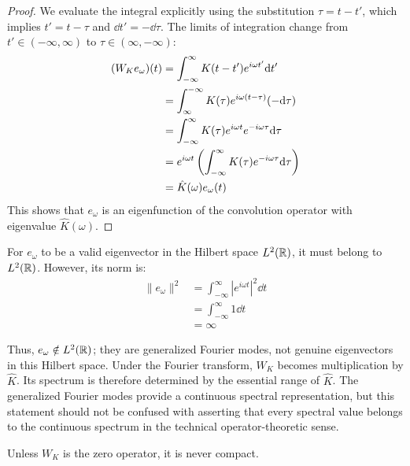 \begin{proof}
We evaluate the integral explicitly using the substitution $\tau = t - t'$, which implies $t' = t - \tau$ and $\dd t' = -\dd \tau$. The limits of integration change from $t' \in (-\infty, \infty)$ to $\tau \in (\infty, -\infty)$:
\begin{align}
(W_K e_\omega)(t) &= \int_{-\infty}^\infty K(t-t') e^{i\omega t'} \mathrm{d} t' \notag \\
    &= \int_{\infty}^{-\infty} K(\tau) e^{i\omega (t-\tau)} (-\mathrm{d} \tau) \notag \\
    &= \int_{-\infty}^\infty K(\tau) e^{i\omega t} e^{-i\omega \tau} \mathrm{d} \tau \notag \\
    &= e^{i\omega t} \left( \int_{-\infty}^\infty K(\tau) e^{-i\omega \tau} \mathrm{d} \tau \right) \notag \\
    &= \hat{K}(\omega) e_\omega(t)
\end{align}
This shows that $e_\omega$ is an eigenfunction of the convolution operator with eigenvalue $\hat{K}(\omega)$.
\end{proof}

\begin{remark}
For $e_\omega$ to be a valid eigenvector in the Hilbert space $L^2(\mathbb{R})$, it must belong to $L^2(\mathbb{R})$. However, its norm is:
\begin{equation}
\begin{aligned}
\|e_\omega\|^2 &= \int_{-\infty}^\infty |e^{i\omega t}|^2 \dd t \\
&= \int_{-\infty}^\infty 1 \dd t \\
&= \infty
\end{aligned}
\end{equation}

Thus, $e_\omega \notin L^2(\mathbb{R})$; they are generalized Fourier modes,
not genuine eigenvectors in this Hilbert space. Under the Fourier
transform, $W_K$ becomes multiplication by $\hat K$. Its spectrum is
therefore determined by the essential range of $\hat K$. The generalized
Fourier modes provide a continuous spectral representation, but this
statement should not be confused with asserting that every spectral value
belongs to the continuous spectrum in the technical operator-theoretic
sense.
\end{remark}

\begin{proposition}
Unless $W_K$ is the zero operator, it is never compact.
\end{proposition}

